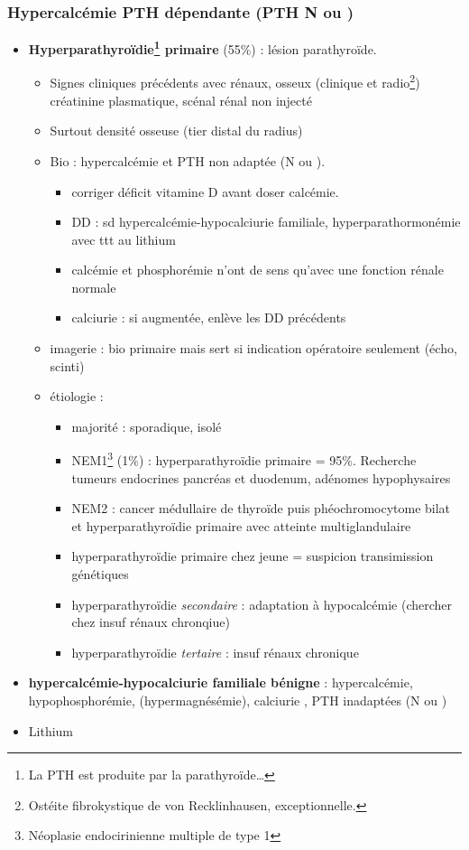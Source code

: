 \documentclass{book}
\begin{document}
\subsubsection{Hypercalcémie PTH dépendante (PTH N ou \inc)}
\label{sec:orgd8d2a19}
\begin{itemize}
\item \textbf{Hyperparathyroïdie\footnote{La PTH est produite par la parathyroïde\ldots{}} primaire} (55\%) : lésion parathyroïde. 
\begin{itemize}
\item Signes cliniques précédents avec rénaux, osseux (clinique et radio\footnote{Ostéite fibrokystique de von Recklinhausen, exceptionnelle.}) \thus créatinine
plasmatique, scénal rénal non injecté
\item Surtout densité osseuse (tier distal du radius)
\item Bio : hypercalcémie et PTH non adaptée (N ou \inc). 
\begin{itemize}
\item \danger corriger déficit vitamine D avant doser calcémie.
\item \danger DD : sd hypercalcémie-hypocalciurie familiale,
hyperparathormonémie avec ttt au lithium
\item calcémie et phosphorémie n'ont de sens qu'avec une fonction rénale normale
\item calciurie : si augmentée, enlève les DD précédents
\end{itemize}
\item imagerie : bio primaire mais sert si indication opératoire seulement (écho, scinti)
\item étiologie :
\begin{itemize}
\item majorité : sporadique, isolé
\item NEM1\footnote{Néoplasie endocirinienne multiple de type 1} (1\%) : hyperparathyroïdie primaire = 95\%. Recherche tumeurs
endocrines pancréas et duodenum, adénomes hypophysaires
\item NEM2 : cancer médullaire de thyroïde puis phéochromocytome bilat et
hyperparathyroïdie primaire avec atteinte multiglandulaire
\item \danger hyperparathyroïdie primaire chez jeune = suspicion transimission
génétiques
\item hyperparathyroïdie \emph{secondaire} : adaptation à hypocalcémie (chercher chez
insuf rénaux chronqiue)
\item hyperparathyroïdie \emph{tertaire} : insuf rénaux chronique
\end{itemize}
\end{itemize}
\item \textbf{hypercalcémie-hypocalciurie familiale bénigne} : hypercalcémie,
hypophosphorémie, (hypermagnésémie), calciurie \dec\dec{}, PTH inadaptées
(N ou \inc)
\item Lithium
\end{itemize}
\end{document}
